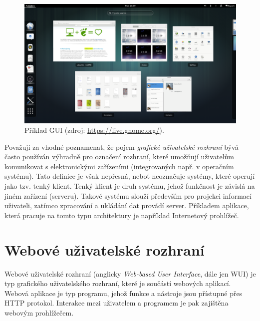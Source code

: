 \begin{figure}[htbp]
    \centering
    \includegraphics[width=\textwidth]{images/gui-example.png}
    \caption{Příklad GUI (zdroj: \url{https://live.gnome.org/}).}
\end{figure}

Považuji za vhodné poznamenat, že pojem \textit{grafické uživatelské rozhraní} bývá často používán výhradně pro označení rozhraní, které umožňují uživatelům komunikovat s elektronickými zařízeními (integrovaných např. v operačním systému). Tato definice je však nepřesná, neboť neoznačuje systémy, které operují jako tzv. tenký klient. Tenký klient je druh systému, jehož funkčnost je závislá na jiném zařízení (serveru). Takové systému slouží především pro projekci informací uživateli, zatímco zpracování a ukládání dat provádí server. Příkladem aplikace, která pracuje na tomto typu architektury je například Internetový prohlížeč.

\section{Webové uživatelské rozhraní}
\label{sec:wui}

Webové uživatelské rozhraní (anglicky \textit{Web-based User Interface}, dále jen WUI) je typ grafického uživatelského rozhraní, které je součástí webových aplikací. Webová aplikace je typ programu, jehož funkce a nástroje jsou přístupné přes HTTP protokol\footnotemark[1]. Interakce mezi uživatelem a programem je pak zajištěna webovým prohlížečem.


